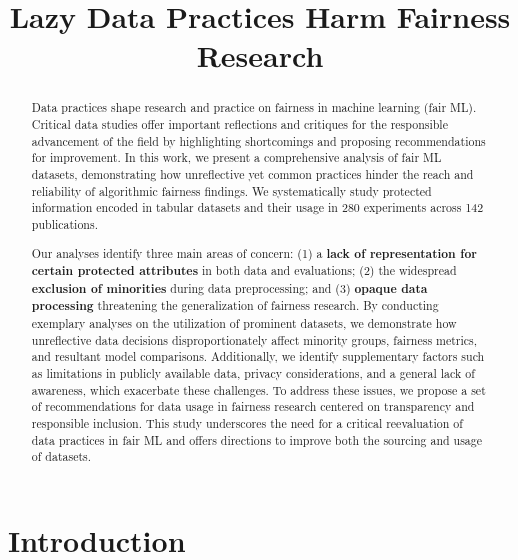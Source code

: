 
\title{Lazy Data Practices Harm Fairness Research}
\begin{abstract}
  Data practices shape research and practice on fairness in machine learning (fair ML). Critical data studies offer important reflections and critiques for the responsible advancement of the field by highlighting shortcomings and proposing recommendations for improvement. In this work, we present a comprehensive analysis of fair ML datasets, demonstrating how unreflective yet common practices hinder the reach and reliability of algorithmic fairness findings. We systematically study protected information encoded in tabular datasets and their usage in 280 experiments across 142 publications.
  
  Our analyses identify three main areas of concern: (1) a \textbf{lack of representation for certain protected attributes} in both data and evaluations; (2) the widespread \textbf{exclusion of minorities} during data preprocessing; and (3) \textbf{opaque data processing} threatening the generalization of fairness research. By conducting exemplary analyses on the utilization of prominent datasets, we demonstrate how unreflective data decisions disproportionately affect minority groups, fairness metrics, and resultant model comparisons.  Additionally, we identify supplementary factors such as limitations in publicly available data, privacy considerations, and a general lack of awareness, which exacerbate these challenges. To address these issues, we propose a set of recommendations for data usage in fairness research centered on transparency and responsible inclusion. This study underscores the need for a critical reevaluation of data practices in fair ML and offers directions to improve both the sourcing and usage of datasets.
\end{abstract}
\maketitle

\section{Introduction}

